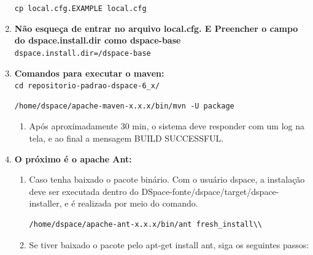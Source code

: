 \documentclass[12pt,hidelinks]{article}
\begin{document}
\begin{enumerate}
            \texttt{cp local.cfg.EXAMPLE local.cfg}\\
            
        \item \textbf{Não esqueça de entrar no arquivo local.cfg. E Preencher o campo do dspace.install.dir como dspace-base}\\
            
            \texttt{dspace.install.dir=/dspace-base}\\
        
        \item \textbf{Comandos para executar o maven:}\\
        
            \texttt{cd repositorio-padrao-dspace-6\_x/}\\
            
             \begin{verbatim}
/home/dspace/apache-maven-x.x.x/bin/mvn -U package
            \end{verbatim}
            
            \begin{enumerate}
            \item Após aproximadamente 30 min, o sistema deve responder com um log na tela, e ao final a mensagem BUILD SUCCESSFUL.\\

            \end{enumerate}
            
        \item \textbf{O próximo é o apache Ant:}\\
        
         \begin{enumerate}
            \item Caso tenha baixado o pacote binário. Com o usuário dspace, a instalação deve ser executada dentro do DSpace-fonte/dspace/target/dspace-installer, e é realizada por meio do comando.\\
            
                \begin{verbatim}
/home/dspace/apache-ant-x.x.x/bin/ant fresh_install\\
            \end{verbatim}
            
            \item Se tiver baixado o pacote pelo apt-get install ant, siga os seguintes passos:\\
            

\end{enumerate}
\end{enumerate}
\end{document}

